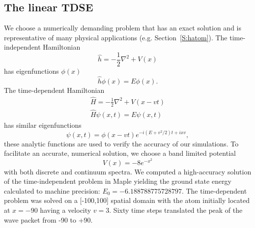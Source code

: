 \documentclass[review,letterpaper]{elsarticle}
\begin{document}
\subsection{The linear TDSE}
\label{S:linearTDSE}
We choose a numerically demanding problem that has an exact solution and is representative
of many physical applications (e.g. Section~\ref{S:hatom}).
The time-independent Hamiltonian
\begin{equation}
\hat{h}=-{\frac{1}{2}}\nabla ^{2}+V(x)
\end{equation}
has eigenfunctions $\phi (x)$
\begin{equation}
\hat{h}\phi(x) = E\phi (x) .
\end{equation}
The time-dependent Hamiltonian
\begin{equation}
\begin{gathered}
\hat{H}=-{\frac{1}{2}}\nabla ^{2}+V(x-vt)\\\hat{H}\psi (x,t)=E\psi (x,t)
\end{gathered}
\end{equation}
has similar eigenfunctions
\begin{equation}
\psi (x,t)=\phi (x-vt)e^{-i(E+v^{2}/2)t+ixv},
\end{equation}
these analytic functions are used to verify the accuracy of our simulations.
To facilitate an accurate, numerical solution, we choose a band limited potential
\begin{equation}
V(x)=-8e^{-x^{2}}
\end{equation}
with both discrete and continuum spectra.
We computed a high-accuracy solution of the time-independent problem
in Maple yielding the ground state energy calculated to machine precision:
$E_{0}=-6.188788775728797$.
The time-dependent problem was solved on a [-100,100] spatial domain with the atom initially
located at  $x=-90$ having a velocity  $v=3$.
Sixty time steps translated the peak of the wave packet from -90 to +90.
\end{document}
